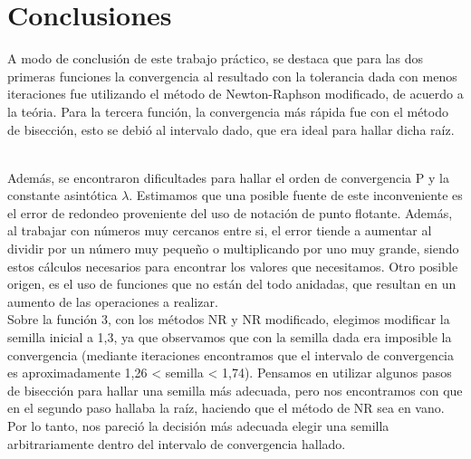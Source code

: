 \documentclass[titlepage,a4paper]{article}
\begin{document}
\section{Conclusiones}\label{sec:conclusiones}

A modo de conclusión de este trabajo práctico, se destaca que para las dos primeras funciones la convergencia al resultado con la tolerancia dada con menos iteraciones fue utilizando el método de Newton-Raphson modificado, de acuerdo a la teória. Para la tercera función, la convergencia más rápida fue con el método de bisección, esto se debió al intervalo dado, que era ideal para hallar dicha raíz.

 \\Además, se encontraron dificultades para hallar el orden de convergencia P y la constante asintótica $\lambda$. Estimamos que una posible fuente de este inconveniente es el error de redondeo proveniente del uso de notación de punto flotante. Además, al trabajar con números muy cercanos entre si, el error tiende a aumentar al dividir por un número muy pequeño o multiplicando por uno muy grande, siendo estos cálculos necesarios para encontrar los valores que necesitamos. Otro posible origen, es el uso de funciones que no están del todo anidadas, que resultan en un aumento de las operaciones a realizar.
 \\Sobre la función 3, con los métodos NR y NR modificado, elegimos modificar la semilla inicial a 1,3, ya que observamos que con la semilla dada era imposible la convergencia (mediante iteraciones encontramos que el intervalo de convergencia es aproximadamente 1,26 < semilla < 1,74). Pensamos en utilizar algunos pasos de bisección para hallar una semilla más adecuada, pero nos encontramos con que en el segundo paso hallaba la raíz, haciendo que el método de NR sea en vano. Por lo tanto, nos pareció la decisión más adecuada elegir una semilla arbitrariamente dentro del intervalo de convergencia hallado.
\end{document}
